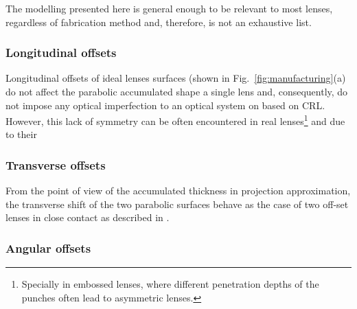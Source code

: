 \begin{refsection}
The modelling presented here is general enough to be relevant to most lenses, regardless of fabrication method and, therefore, is not an exhaustive list. 



\subsubsection*{Longitudinal offsets}

Longitudinal offsets of ideal lenses surfaces (shown in Fig.~\ref{fig:manufacturing}(a) do not affect the parabolic accumulated shape a single lens and, consequently, do not impose any optical imperfection to an optical system on based on CRL. However, this lack of symmetry can be often encountered in real lenses\footnote{Specially in embossed lenses, where different penetration depths of the punches often lead to asymmetric lenses.} and due to their 

\subsubsection*{Transverse offsets}

From the point of view of the accumulated thickness in projection approximation, the transverse shift of the two parabolic surfaces behave as the case of two off-set lenses in close contact as described in .

\subsubsection*{Angular offsets}


\end{refsection}
